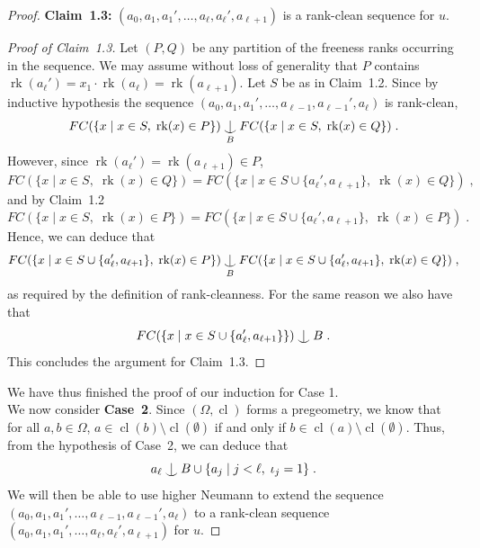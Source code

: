\documentclass{article}
\theoremstyle{remark}
\theoremstyle{definition}
\DeclareMathOperator{\rk}{rk}
\DeclareMathOperator{\cl}{cl}
\def\Ind#1#2{#1\setbox0=\hbox{$#1x$}\kern\wd0\hbox to 0pt{\hss$#1\mid$\hss}
	\lower.9\ht0\hbox to 0pt{\hss$#1\smile$\hss}\kern\wd0}
\def\ind{\mathop{\mathpalette\Ind{}}}
\newenvironment{subproof}[1][\proofname]{%
  \renewcommand{\qedsymbol}{$\blacksquare$}%
  \begin{proof}[#1]%
}{%
  \end{proof}%
}
\begin{document}
{\begin{proof}
\textbf{Claim~1.3:} $(a_0,a_1,a_1',\ldots,a_\ell,a_\ell',a_{\ell+1})$ is  a rank-clean sequence for $u$.
\begin{subproof}[Proof of Claim~1.3]
Let $(P, Q)$ be any partition of the freeness ranks occurring in the sequence. We may assume without loss of generality that $P$ contains $\rk(a_\ell')=x_1\cdot \rk(a_\ell)=\rk(a_{\ell+1})$. %
Let $S$ be as in Claim~1.2. Since by inductive hypothesis the sequence  $(a_0,a_1,a_1', \dots,a_{\ell-1},a_{\ell-1}', a_\ell)$ is rank-clean,
\[FC(\{x\;\vert\; x \in S,\; \rk(x)\in P\})\ind_B FC(\{x\;\vert\; x \in S,\; \rk(x)\in Q\})\;.\]
However, since $\rk(a_\ell')=\rk(a_{\ell+1})\in P$, 
\[FC(\{x\;\vert\; x \in S,\; \rk(x)\in Q\})=FC(\{x\;\vert\; x \in S\cup\{a_\ell', a_{\ell+1}\},\; \rk(x)\in Q\})\;,\]
and by Claim~1.2 
   \[FC(\{x\;\vert\; x \in S,\; \rk(x)\in P\})=FC(\{x\;\vert\; x \in S\cup\{a_\ell', a_{\ell+1}\},\; \rk(x)\in P\})\;.\]
   Hence, we can deduce that 
   \[FC(\{x\;\vert\; x \in S\cup\{a_\ell', a_{\ell+1}\},\; \rk(x)\in P\})\ind_B FC(\{x\;\vert\; x \in S\cup\{a_\ell', a_{\ell+1}\},\; \rk(x)\in Q\})\;,\]
   as required by the definition of rank-cleanness. For the same reason we also have that %
   \[FC(\{x\;\vert\; x \in S\cup\{a_\ell', a_{\ell+1}\}\}%
   {)\ind B}\;.\]
   This concludes the argument for Claim~1.3. 
\end{subproof}

We have thus finished the proof of our induction for Case 1.\\

We now consider \textbf{Case~2}. Since $(\Omega, {\cl})$ forms a pregeometry, we know that for all  $a,b\in\Omega$, $a\in{\cl}(b){\setminus{\cl}(\emptyset)}$ if and only if $b\in{\cl}(a){\setminus{\cl}(\emptyset)}$. Thus, from the hypothesis of Case~2, we can deduce that 
\[a_\ell \ind B\cup \{a_j\;|\; j<\ell,\; \iota_j=1\}\;.\]
We will then be able to use higher Neumann  to extend the sequence $(a_0,a_1,a_1', \dots,a_{\ell-1}, a_{\ell-1}', a_\ell)$ to a rank-{clean} sequence $(a_0,a_1,a_1', \dots,a_{\ell}, a_{\ell}', a_{\ell+1})$ for $u$.


\end{proof}}
\end{document}
